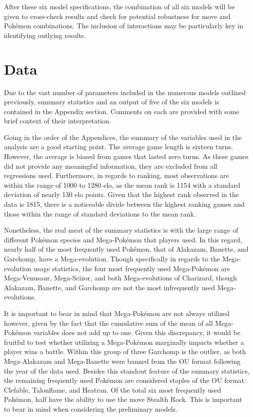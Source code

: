 \documentclass[12pt,twoside]{reedthesis}
\begin{document}
  After these six model specifications, the combination of all six models
  will be given to cross-check results and check for potential robustness
  for move and Pokémon combinations. The inclusion of interactions may be
  particularly key in identifying outlying results.
  
  \chapter{Data}\label{data}
  
  Due to the vast number of parameters included in the numerous models
  outlined previously, summary statistics and an output of five of the six
  models is contained in the Appendix section. Comments on each are
  provided with some brief context of their interpretation.
  
  Going in the order of the Appendices, the summary of the variables used
  in the analysis are a good starting point. The average game length is
  sixteen turns. However, the average is biased from games that lasted
  zero turns. As these games did not provide any meaningful information,
  they are excluded from all regressions used. Furthermore, in regards to
  ranking, most observations are within the range of 1000 to 1280 elo, as
  the mean rank is 1154 with a standard deviation of nearly 130 elo
  points. Given that the highest rank observed in the data is 1815, there
  is a noticeable divide between the highest ranking games and those
  within the range of standard deviations to the mean rank.
  
  Nonetheless, the real meat of the summary statistics is with the large
  range of different Pokémon species and Mega-Pokémon that players used.
  In this regard, nearly half of the most frequently used Pokémon, that of
  Alakazam, Banette, and Garchomp, have a Mega-evolution. Though
  specifically in regards to the Mega-evolution usage statistics, the four
  most frequently used Mega-Pokémon are Mega-Venusaur, Mega-Scizor, and
  both Mega-evolutions of Charizard, though Alakazam, Banette, and
  Garchomp are not the most infrequently used Mega-evolutions.
  
  It is important to bear in mind that Mega-Pokémon are not always
  utilized however, given by the fact that the cumulative sum of the mean
  of all Mega-Pokémon variables does not add up to one. Given this
  discrepancy, it would be fruitful to test whether utilizing a
  Mega-Pokémon marginally impacts whether a player wins a battle. Within
  this group of three Garchomp is the outlier, as both Mega-Alakazam and
  Mega-Banette were banned from the OU format following the year of the
  data used. Besides this standout feature of the summary statistics, the
  remaining frequently used Pokémon are considered staples of the OU
  format: Clefable, Talonflame, and Heatran. Of the total six most
  frequently used Pokémon, half have the ability to use the move Stealth
  Rock. This is important to bear in mind when considering the preliminary
  models.
  
\end{document}
